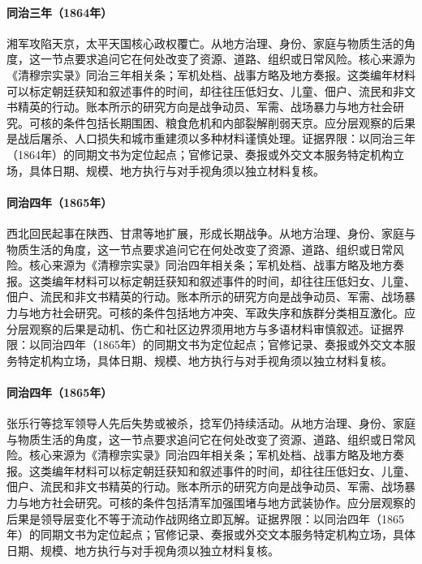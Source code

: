 \hypertarget{social:EQ-1864-TIANJING-FALL}{}\paragraph{同治三年（1864年）}湘军攻陷天京，太平天国核心政权覆亡。从地方治理、身份、家庭与物质生活的角度，这一节点要求追问它在何处改变了资源、道路、组织或日常风险。核心来源为《清穆宗实录》同治三年相关条；军机处档、战事方略及地方奏报。这类编年材料可以标定朝廷获知和叙述事件的时间，却往往压低妇女、儿童、佃户、流民和非文书精英的行动。账本所示的研究方向是战争动员、军需、战场暴力与地方社会研究。可核的条件包括长期围困、粮食危机和内部裂解削弱天京。应分层观察的后果是战后屠杀、人口损失和城市重建须以多种材料谨慎处理。证据界限：以同治三年（1864年）的同期文书为定位起点；官修记录、奏报或外交文本服务特定机构立场，具体日期、规模、地方执行与对手视角须以独立材料复核。
\hypertarget{social:EQ-1865-DUNGAN-REVOLT}{}\paragraph{同治四年（1865年）}西北回民起事在陕西、甘肃等地扩展，形成长期战争。从地方治理、身份、家庭与物质生活的角度，这一节点要求追问它在何处改变了资源、道路、组织或日常风险。核心来源为《清穆宗实录》同治四年相关条；军机处档、战事方略及地方奏报。这类编年材料可以标定朝廷获知和叙述事件的时间，却往往压低妇女、儿童、佃户、流民和非文书精英的行动。账本所示的研究方向是战争动员、军需、战场暴力与地方社会研究。可核的条件包括地方冲突、军政失序和族群分类相互激化。应分层观察的后果是动机、伤亡和社区边界须用地方与多语材料审慎叙述。证据界限：以同治四年（1865年）的同期文书为定位起点；官修记录、奏报或外交文本服务特定机构立场，具体日期、规模、地方执行与对手视角须以独立材料复核。
\hypertarget{social:EQ-1865-NIAN-LEADER-DEATH}{}\paragraph{同治四年（1865年）}张乐行等捻军领导人先后失势或被杀，捻军仍持续活动。从地方治理、身份、家庭与物质生活的角度，这一节点要求追问它在何处改变了资源、道路、组织或日常风险。核心来源为《清穆宗实录》同治四年相关条；军机处档、战事方略及地方奏报。这类编年材料可以标定朝廷获知和叙述事件的时间，却往往压低妇女、儿童、佃户、流民和非文书精英的行动。账本所示的研究方向是战争动员、军需、战场暴力与地方社会研究。可核的条件包括清军加强围堵与地方武装协作。应分层观察的后果是领导层变化不等于流动作战网络立即瓦解。证据界限：以同治四年（1865年）的同期文书为定位起点；官修记录、奏报或外交文本服务特定机构立场，具体日期、规模、地方执行与对手视角须以独立材料复核。
